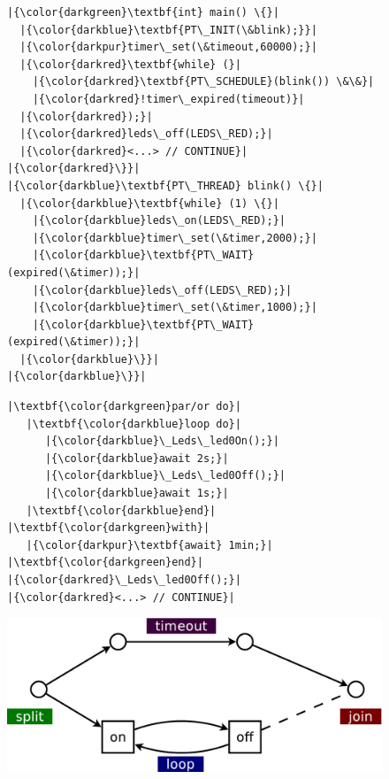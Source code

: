 \begin{figure}[!t]
\begin{minipage}[t]{0.50\linewidth}
\begin{lstlisting}[title=\emph{/* nesC */}]
\end{lstlisting}
\end{minipage}
%
%
\begin{minipage}[t]{0.50\linewidth}
\begin{lstlisting}[title=\emph{/* Protothreads */}]
|{\color{darkgreen}\textbf{int} main() \{}|
  |{\color{darkblue}\textbf{PT\_INIT(\&blink);}}|
  |{\color{darkpur}timer\_set(\&timeout,60000);}|
  |{\color{darkred}\textbf{while} (}|
    |{\color{darkred}\textbf{PT\_SCHEDULE}(blink()) \&\&}|
    |{\color{darkred}!timer\_expired(timeout)}|
  |{\color{darkred});}|
  |{\color{darkred}leds\_off(LEDS\_RED);}|
  |{\color{darkred}<...> // CONTINUE}|
|{\color{darkred}\}}|
|{\color{darkblue}\textbf{PT\_THREAD} blink() \{}|
  |{\color{darkblue}\textbf{while} (1) \{}|
    |{\color{darkblue}leds\_on(LEDS\_RED);}|
    |{\color{darkblue}timer\_set(\&timer,2000);}|
    |{\color{darkblue}\textbf{PT\_WAIT}(expired(\&timer));}|
    |{\color{darkblue}leds\_off(LEDS\_RED);}|
    |{\color{darkblue}timer\_set(\&timer,1000);}|
    |{\color{darkblue}\textbf{PT\_WAIT}(expired(\&timer));}|
  |{\color{darkblue}\}}|
|{\color{darkblue}\}}|
\end{lstlisting}
\end{minipage}
%
%
\begin{minipage}[t]{0.50\linewidth}
\begin{lstlisting}[title=/* \CEU */]
|\textbf{\color{darkgreen}par/or do}|
   |\textbf{\color{darkblue}loop do}|
      |{\color{darkblue}\_Leds\_led0On();}|
      |{\color{darkblue}await 2s;}|
      |{\color{darkblue}\_Leds\_led0Off();}|
      |{\color{darkblue}await 1s;}|
   |\textbf{\color{darkblue}end}|
|\textbf{\color{darkgreen}with}|
   |{\color{darkpur}\textbf{await} 1min;}|
|\textbf{\color{darkgreen}end}|
|{\color{darkred}\_Leds\_led0Off();}|
|{\color{darkred}<...> // CONTINUE}|
\end{lstlisting}
\end{minipage}
%
%
\begin{minipage}[t]{0.50\linewidth}
\vspace{30pt}
\centering
\includegraphics[width=\textwidth]{dia}

\end{minipage}
\end{figure}
